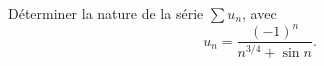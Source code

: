 \begin{enonce}
\begin{exercise}[ID={RMS133 E1307},subtitle={IMT MP 2022},tags={},difficulty={}]
Déterminer la nature de la série $\sum u_n$, avec
\begin{equation*}
  u_n = \frac{(-1)^n}{n^{3/4} + \sin n}.
\end{equation*}
\end{exercise}
\begin{solution}
\end{solution}
\end{enonce}
